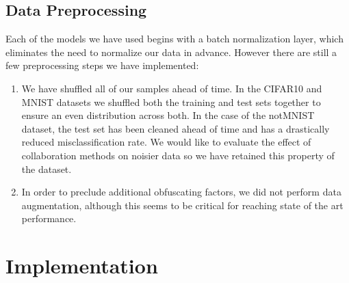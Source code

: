 \documentclass[english,a4paper,oneside]{amsart}
\theoremstyle{definition}
\begin{document}
\subsection{Data Preprocessing}
Each of the models we have used begins with a batch normalization layer, which eliminates the need to normalize our data in advance. However there are still a few preprocessing steps we have implemented:
\begin{enumerate}
	\item We have shuffled all of our samples ahead of time. In the CIFAR10 and MNIST datasets we shuffled both the training and test sets together to ensure an even distribution across both. In the case of the notMNIST dataset, the test set has been cleaned ahead of time and has a drastically reduced misclassification rate. We would like to evaluate the effect of collaboration methods on noisier data so we have retained this property of the dataset.


	\item In order to preclude additional obfuscating factors, we did not perform data augmentation, although this seems to be critical for reaching state of the art performance. 


\end{enumerate}
\section{Implementation}
\end{document}
